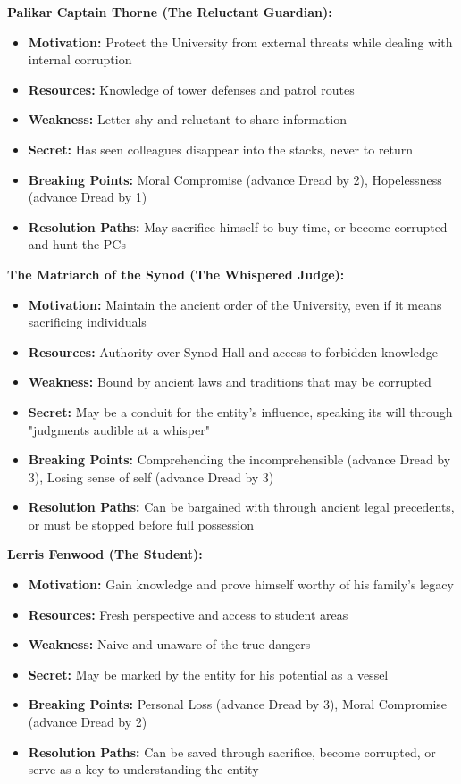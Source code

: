 \documentclass[11pt]{article}
\begin{document}
\textbf{Palikar Captain Thorne (The Reluctant Guardian):}
\begin{itemize}
    \item \textbf{Motivation:} Protect the University from external threats while dealing with internal corruption
    \item \textbf{Resources:} Knowledge of tower defenses and patrol routes
    \item \textbf{Weakness:} Letter-shy and reluctant to share information
    \item \textbf{Secret:} Has seen colleagues disappear into the stacks, never to return
    \item \textbf{Breaking Points:} Moral Compromise (advance Dread by 2), Hopelessness (advance Dread by 1)
    \item \textbf{Resolution Paths:} May sacrifice himself to buy time, or become corrupted and hunt the PCs
\end{itemize}

\textbf{The Matriarch of the Synod (The Whispered Judge):}
\begin{itemize}
    \item \textbf{Motivation:} Maintain the ancient order of the University, even if it means sacrificing individuals
    \item \textbf{Resources:} Authority over Synod Hall and access to forbidden knowledge
    \item \textbf{Weakness:} Bound by ancient laws and traditions that may be corrupted
    \item \textbf{Secret:} May be a conduit for the entity's influence, speaking its will through "judgments audible at a whisper"
    \item \textbf{Breaking Points:} Comprehending the incomprehensible (advance Dread by 3), Losing sense of self (advance Dread by 3)
    \item \textbf{Resolution Paths:} Can be bargained with through ancient legal precedents, or must be stopped before full possession
\end{itemize}

\textbf{Lerris Fenwood (The Student):}
\begin{itemize}
    \item \textbf{Motivation:} Gain knowledge and prove himself worthy of his family's legacy
    \item \textbf{Resources:} Fresh perspective and access to student areas
    \item \textbf{Weakness:} Naive and unaware of the true dangers
    \item \textbf{Secret:} May be marked by the entity for his potential as a vessel
    \item \textbf{Breaking Points:} Personal Loss (advance Dread by 3), Moral Compromise (advance Dread by 2)
    \item \textbf{Resolution Paths:} Can be saved through sacrifice, become corrupted, or serve as a key to understanding the entity
\end{itemize}
\end{document}
